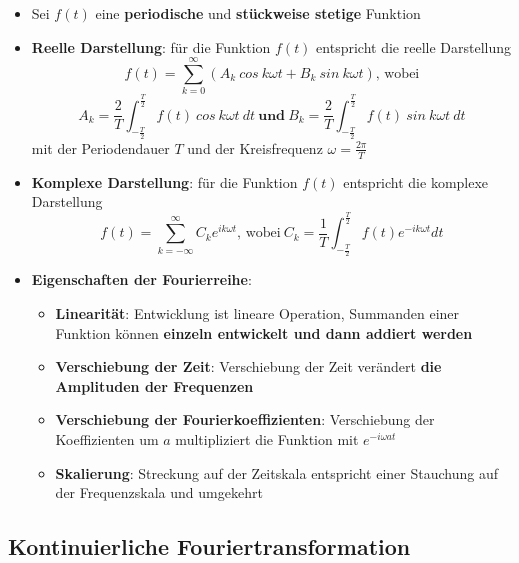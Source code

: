 \begin{itemize}
	\item Sei $f(t)$ eine \textbf{periodische} und \textbf{stückweise stetige} Funktion
	\item \textbf{Reelle Darstellung}: für die Funktion $f(t)$ entspricht die reelle Darstellung
	$$f(t) = \sum^\infty_{k=0}(A_k\ cos\ k\omega t + B_k\ sin\ k\omega t)\text{, wobei}$$
	$$A_k = \frac{2}{T}\int^{\frac{T}{2}}_{-\frac{T}{2}}f(t)\ cos\ k\omega t\ dt\ \mathbf{und}\ B_k = \frac{2}{T}\int^{\frac{T}{2}}_{-\frac{T}{2}}f(t)\ sin\ k\omega t\ dt$$
	mit der Periodendauer $T$ und der Kreisfrequenz $\omega = \frac{2\pi}{T}$
	\item \textbf{Komplexe Darstellung}: für die Funktion $f(t)$ entspricht die komplexe Darstellung
	$$f(t) = \sum^\infty_{k=-\infty}C_ke^{ik\omega t}\text{, wobei}\ C_k = \frac{1}{T}\int^{\frac{T}{2}}_{-\frac{T}{2}}f(t)e^{-ik\omega t}dt$$
	\item \textbf{Eigenschaften der Fourierreihe}:
	\begin{itemize}
		\item \textbf{Linearität}: Entwicklung ist lineare Operation, Summanden einer Funktion können \textbf{einzeln entwickelt und dann addiert werden}
		\item \textbf{Verschiebung der Zeit}: Verschiebung der Zeit verändert \textbf{die Amplituden der Frequenzen}
		\item \textbf{Verschiebung der Fourierkoeffizienten}: Verschiebung der Koeffizienten um $a$ multipliziert die Funktion mit $e^{-i\omega at}$
		\item \textbf{Skalierung}: Streckung auf der Zeitskala entspricht einer Stauchung auf der Frequenzskala und umgekehrt
	\end{itemize}
\end{itemize}

\subsection{Kontinuierliche Fouriertransformation}%
\label{four:sub:kontinuierliche_fouriertransformation}

